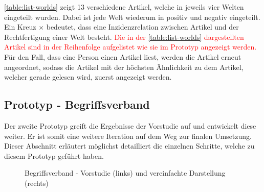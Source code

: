 \autoref{table:list-worlds} zeigt 13 verschiedene Artikel, welche in jeweils vier Welten eingeteilt wurden.
Dabei ist jede Welt wiederum in positiv und negativ eingeteilt.
Ein Kreuz $\times$ bedeutet, dass eine Inzidenzrelation zwischen Artikel und der Rechtfertigung einer Welt besteht.
\textcolor{red}{Die in der \autoref{table:list-worlds} dargestellten Artikel sind in der Reihenfolge aufgelistet wie sie im Prototyp angezeigt werden.}
Für den Fall, dass eine Person einen Artikel liest, werden die Artikel erneut angeordnet, sodass die Artikel mit der höchsten Ähnlichkeit zu dem Artikel, welcher gerade gelesen wird, zuerst angezeigt werden.

\subsection{Prototyp - Begriffsverband}\label{subsubsec:prototyp-2}
Der zweite Prototyp greift die Ergebnisse der Vorstudie auf und entwickelt diese weiter.
Er ist somit eine weitere Iteration auf dem Weg zur finalen Umsetzung.
Dieser Abschnitt erläutert möglichst detailliert die einzelnen Schritte, welche zu diesem Prototyp geführt haben.\\

\begin{figure}[!ht]
    \centering
    \caption{Begriffsverband - Vorstudie (links) und vereinfachte Darstellung (rechts)}
    \label{fig:industry-comparison}
\end{figure}

